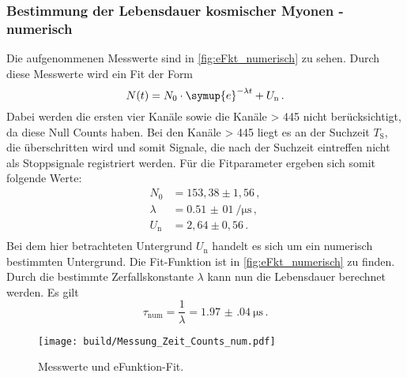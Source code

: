   \subsubsection{Bestimmung der Lebensdauer kosmischer Myonen - numerisch}
    Die aufgenommenen Messwerte sind in \autoref{fig:eFkt_numerisch} zu sehen.
    Durch diese Messwerte wird ein Fit der Form
    \begin{equation*}
      N(t) = N_0 \cdot \symup{e}^{-\lambda t} +U_\text{n} \, .
    \end{equation*}
    Dabei werden die ersten vier Kanäle sowie die Kanäle > 445 nicht berücksichtigt, da diese Null Counts haben.
    Bei den Kanäle > 445 liegt es an der Suchzeit $T_\text{S}$, die überschritten wird und somit Signale, die nach der Suchzeit eintreffen nicht als Stoppsignale registriert werden.
    Für die Fitparameter ergeben sich somit folgende Werte:
    \begin{align*}
      N_0 &= 153,38 \pm 1,56 \, ,\\
      \lambda &= \SI{0,51(01)}{\per\micro\second} \, ,\\
      U_\text{n} &= 2,64 \pm 0,56 \, . \\
    \end{align*}
    Bei dem hier betrachteten Untergrund $U_\text{n}$ handelt es sich um ein numerisch bestimmten Untergrund.
    Die Fit-Funktion ist in \autoref{fig:eFkt_numerisch} zu finden.
    Durch die bestimmte Zerfallskonstante $\lambda$ kann nun die Lebensdauer berechnet werden.
    Es gilt
    \begin{equation*}
      \tau_\text{num} = \frac{1}{\lambda} = \SI{1.97(04)}{\micro\second} \, .
    \end{equation*}
    \begin{figure}
      \centering
      \texttt{[image: build/Messung\_Zeit\_Counts\_num.pdf]}
      \caption{Messwerte und eFunktion-Fit.}
      \label{fig:eFkt_numerisch}
    \end{figure}

